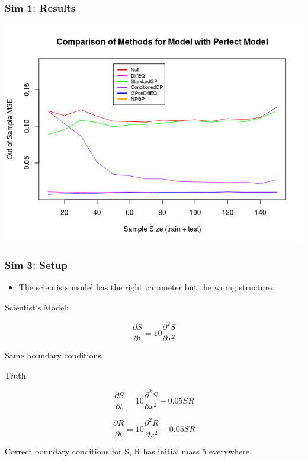 \documentclass{beamer}
\begin{document}
	\begin{frame}
		\frametitle{Sim 1: Results}
		
		\includegraphics[scale=0.5]{PrezImage5.png}
		
	\end{frame}
	
	\begin{frame}
		\frametitle{Sim 3: Setup}
		
		\begin{itemize}
			\item The scientists model has the right parameter but the wrong structure.
		\end{itemize}
		
		Scientist's Model:
		
		$$\frac{\partial S}{\partial t} = 10 \frac{\partial^2 S}{\partial x^2}$$
		
		Same boundary conditions
		\vspace{1em}
		
		Truth:
		
		$$\frac{\partial S}{\partial t} = 10 \frac{\partial^2 S}{\partial x^2} - 0.05 S R$$
		
		$$\frac{\partial R}{\partial t} = 10 \frac{\partial^2 R}{\partial x^2} - 0.05 S R$$
		
		Correct boundary conditions for S, R has initial mass 5 everywhere.
		
	\end{frame}
	
\end{document}
